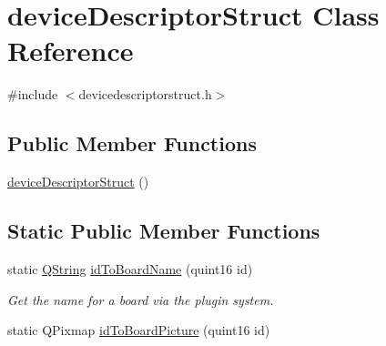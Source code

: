 \hypertarget{classdevice_descriptor_struct}{\section{device\-Descriptor\-Struct \-Class \-Reference}
\label{classdevice_descriptor_struct}
}


{\ttfamily \#include $<$devicedescriptorstruct.\-h$>$}

\subsection*{\-Public \-Member \-Functions}
\begin{DoxyCompactItemize}
\item 
\hyperlink{group___u_a_v_object_util_plugin_ga09cd541275c17c51873b51573cacbb5d}{device\-Descriptor\-Struct} ()
\end{DoxyCompactItemize}
\subsection*{\-Static \-Public \-Member \-Functions}
\begin{DoxyCompactItemize}
\item 
static \hyperlink{group___u_a_v_objects_plugin_gab9d252f49c333c94a72f97ce3105a32d}{\-Q\-String} \hyperlink{group___u_a_v_object_util_plugin_ga7e79b308b3743586bbaed68286e694e6}{id\-To\-Board\-Name} (quint16 id)
\begin{DoxyCompactList}\small\item\em \-Get the name for a board via the plugin system. \end{DoxyCompactList}\item 
static \-Q\-Pixmap \hyperlink{group___u_a_v_object_util_plugin_ga445e8ccb97ef5d05ed372fbd13532042}{id\-To\-Board\-Picture} (quint16 id)
\end{DoxyCompactItemize}
